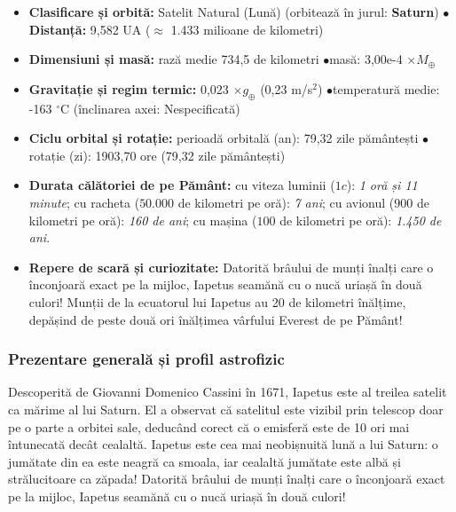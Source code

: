 \begin{tcolorbox}[orbitardata, title={\textbf{Repere esențiale: Iapetus}}]
\small
\begin{itemize}[leftmargin=1.4em, itemsep=2pt, topsep=2pt]
  \item \textbf{Clasificare și orbită:} Satelit Natural (Lună) (orbitează în jurul: \textbf{Saturn}) \quad$\bullet$\quad \textbf{Distanță:} 9,582 UA ($\approx$ 1.433 milioane de kilometri)
  \item \textbf{Dimensiuni și masă:} rază medie 734,5 de kilometri \quad$\bullet$\quad masă: 3,00e-4 $\times M_\oplus$
  \item \textbf{Gravitație și regim termic:} 0,023 $\times g_\oplus$ (0,23 m/s$^2$) \quad$\bullet$\quad temperatură medie: -163 $^\circ$C (înclinarea axei: Nespecificată)
  \item \textbf{Ciclu orbital și rotație:} perioadă orbitală (an): 79,32 zile pământești \quad$\bullet$\quad rotație (zi): 1903,70 ore (79,32 zile pământești)
  \item \textbf{Durata călătoriei de pe Pământ:} cu viteza luminii ($1c$): \emph{1 oră și 11 minute}; cu racheta ($50.000$ de kilometri pe oră): \emph{7 ani}; cu avionul ($900$ de kilometri pe oră): \emph{160 de ani}; cu mașina ($100$ de kilometri pe oră): \emph{1.450 de ani}.
  \item \textbf{Repere de scară și curiozitate:} Datorită brâului de munți înalți care o înconjoară exact pe la mijloc, Iapetus seamănă cu o nucă uriașă în două culori! Munții de la ecuatorul lui Iapetus au 20 de kilometri înălțime, depășind de peste două ori înălțimea vârfului Everest de pe Pământ!
\end{itemize}
\end{tcolorbox}

\subsubsection*{Prezentare generală și profil astrofizic}
Descoperită de Giovanni Domenico Cassini în 1671, Iapetus este al treilea satelit ca mărime al lui Saturn. El a observat că satelitul este vizibil prin telescop doar pe o parte a orbitei sale, deducând corect că o emisferă este de 10 ori mai întunecată decât cealaltă. Iapetus este cea mai neobișnuită lună a lui Saturn: o jumătate din ea este neagră ca smoala, iar cealaltă jumătate este albă și strălucitoare ca zăpada! Datorită brâului de munți înalți care o înconjoară exact pe la mijloc, Iapetus seamănă cu o nucă uriașă în două culori!

